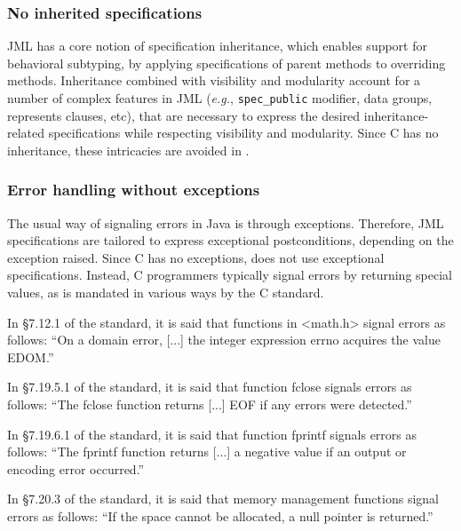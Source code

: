 \subsubsection*{No inherited specifications}

JML has a core notion of specification inheritance, which
enables support for behavioral subtyping, by applying
 specifications of parent methods to overriding methods.  Inheritance
combined with visibility and modularity account for a number of
complex features in JML (\emph{e.g.}, \verb|spec_public| modifier, data
groups, represents clauses, etc), that are necessary to express the
desired inheritance-related specifications while respecting visibility
and modularity. Since C has no inheritance, these intricacies are
avoided in \acsl.

\subsubsection*{Error handling without exceptions}
\label{sec:errorhandling}

The usual way of signaling errors in Java is through
exceptions. Therefore, JML specifications are tailored to express
exceptional postconditions, depending on the exception raised. Since C
has no exceptions, \acsl does not use exceptional
specifications. Instead, C programmers typically signal errors by
returning special values, as is mandated in various ways by the C standard.

\begin{example}
In \S 7.12.1 of the standard, it is said that functions in <math.h>
signal errors as follows:
``On a domain error, [...] the integer expression errno
acquires the value EDOM.''
\end{example}

\begin{example}
In \S 7.19.5.1 of the standard, it is said that function fclose signals
errors as follows:
``The fclose function returns [...] EOF if any errors were detected.''
\end{example}

\begin{example}
In \S 7.19.6.1 of the standard, it is said that function fprintf
signals errors as follows:
``The fprintf function returns [...] a negative value if an output or
encoding error occurred.''
\end{example}

\begin{example}
In \S 7.20.3 of the standard, it is said that memory management functions
signal errors as follows:
``If the space cannot be allocated, a null pointer is returned.''
\end{example}

